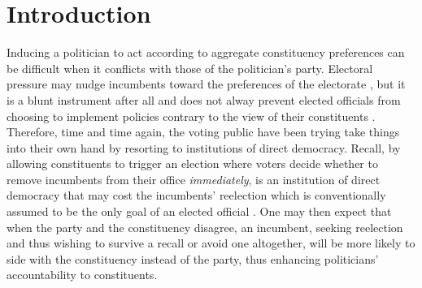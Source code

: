\documentclass{article}
\begin{document}
	
	
	
	
	\section*{Introduction}
	
		Inducing a politician to act according to aggregate constituency preferences
		can be difficult when
		it conflicts with those of the politician's party.
		Electoral pressure may nudge incumbents toward the preferences of the electorate
		\autocite{millerConstituencyInfluenceCongress1963},
		but it is a blunt instrument after all
		and does not alway prevent
		elected officials from choosing to implement policies contrary to the view of their constituents
		\autocite{kirklandIndecisionAmericanLegislatures2018}.
		Therefore, time and time again, the voting public have been trying take things into their own hand
		by resorting to institutions of direct democracy.
		Recall,
		by allowing constituents to trigger an election where voters decide whether to remove incumbents from their office \textit{immediately}, 
		is an institution
		of direct democracy
		that may cost the incumbents' reelection
		which is conventionally assumed to be the only goal of an elected official
		\autocite{mayhewCongressElectoralConnection1974}.
		One may
		then
		expect that 
		when the party and the constituency disagree,
		an incumbent,
		seeking reelection and thus 
		wishing to survive a recall or 
		avoid one altogether,
		will be more likely to side with the constituency instead of the party,
		thus enhancing politicians' accountability to constituents.
		
\end{document}
